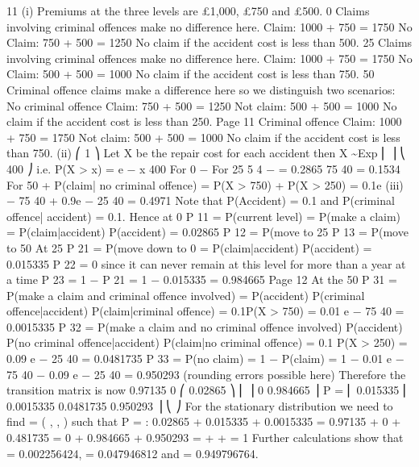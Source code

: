\documentclass[a4paper,12pt]{article}
\begin{document}
11
(i)
Premiums at the three levels are £1,000, £750 and £500.
0%
Claims involving criminal offences make no difference here.
Claim: 1000 + 750 = 1750
No Claim: 750 + 500 = 1250
No claim if the accident cost is less than 500.
25%
Claims involving criminal offences make no difference here.
Claim: 1000 + 750 = 1750
No Claim: 500 + 500 = 1000
No claim if the accident cost is less than 750.
50%
Criminal offence claims make a difference here so we distinguish two
scenarios:
No criminal offence
Claim: 750 + 500 = 1250
Not claim: 500 + 500 = 1000
No claim if the accident cost is less than 250.
Page 11%
Criminal offence
Claim: 1000 + 750 = 1750
Not claim: 500 + 500 = 1000
No claim if the accident cost is less than 750.
(ii)
⎛ 1 ⎞
Let X be the repair cost for each accident then X \sim  Exp ⎜
⎟
⎝ 400 ⎠
i.e. P(X > x) = e
−
x
400
For 0%
−
For 25%
5
4
−
= 0.2865
75
40
= 0.1534
For 50%
+ P(claim| no criminal offence)
= P(X > 750)  + P(X > 250) 
= 0.1e
(iii)
−
75
40
+ 0.9e
−
25
40 =
0.4971
Note that P(Accident) = 0.1 and P(criminal offence| accident) = 0.1.
Hence at 0%
P 11 = P(current level) = P(make a claim)
= P(claim|accident) P(accident) = 0.02865
P 12 = P(move to 25%
P 13 = P(move to 50%
At 25%
P 21 = P(move down to 0%
= P(claim|accident) P(accident) = 0.015335
P 22 = 0 since it can never remain at this level for more than a year at a time
P 23 = 1 − P 21 = 1 − 0.015335 = 0.984665
Page 12%
At the 50%
P 31 = P(make a claim and criminal offence involved)
= P(accident) P(criminal offence|accident) P(claim|criminal offence)
= \times  0.1P(X > 750) = 0.01 \times  e
−
75
40
= 0.0015335
P 32 = P(make a claim and no criminal offence involved) P(accident)
P(no criminal offence|accident) P(claim|no criminal offence)
= 0.1  \times  P(X > 250) = 0.09 \times  e
−
25
40
= 0.0481735
P 33 = P(no claim) = 1 − P(claim)
= 1 − 0.01 \times  e
−
75
40
− 0.09 \times  e
−
25
40
= 0.950293 (rounding errors possible here)
Therefore the transition matrix is now
0.97135
0
⎛ 0.02865
⎞
⎜
⎟
0
0.984665 ⎟
P = ⎜ 0.015335
⎜ 0.0015335 0.0481735 0.950293 ⎟
⎝
⎠
For the stationary distribution we need to find \pi  = ( ,  ,  ) such
that \pi P = \pi :
 0.02865 +  0.015335 +  0.0015335 = 
 0.97135 + 0 +  0.481735 = 
0 +  0.984665 +  0.950293 = 
 +  +  = 1
Further calculations show that  = 0.002256424,  = 0.047946812 and
 = 0.949796764.
\end{document}
